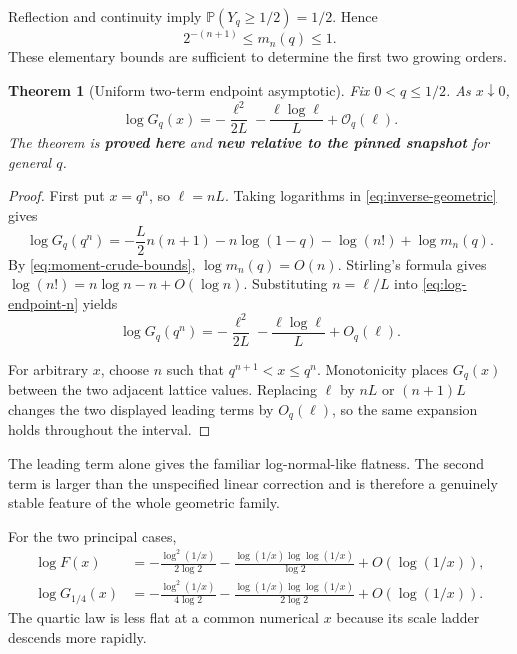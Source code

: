 \documentclass[11pt,oneside]{article}
\numberwithin{equation}{section}
\newtheorem{theorem}{Theorem}[section]
\theoremstyle{definition}
\theoremstyle{remark}
\newcommand{\Prob}{\mathbb P}
\newcommand{\bigO}{\mathcal O}
\newcommand{\proved}{\textcolor{deepgreen}{\textbf{proved here}}}
\newcommand{\auditnew}{\textcolor{deepviolet}{\textbf{new relative to the pinned snapshot}}}
\begin{document}
Reflection and continuity imply
$\Prob(Y_q\ge1/2)=1/2$.  Hence
\begin{equation}
 2^{-(n+1)}\le m_n(q)\le1.
 \label{eq:moment-crude-bounds}
\end{equation}
These elementary bounds are sufficient to determine the first two growing
orders.

\begin{theorem}[Uniform two-term endpoint asymptotic]
\label{thm:endpoint-asymptotic}
Fix $0<q\le1/2$.  As $x\downarrow0$,
\begin{equation}
 \boxed{
 \log G_q(x)=
 -\frac{\ell^2}{2L}
 -\frac{\ell\log\ell}{L}
 +\bigO_q(\ell).}
 \label{eq:endpoint-asymptotic}
\end{equation}
The theorem is \proved{} and \auditnew{} for general $q$.
\end{theorem}

\begin{proof}
First put $x=q^n$, so $\ell=nL$.  Taking logarithms in
\eqref{eq:inverse-geometric} gives
\begin{equation}
 \log G_q(q^n)
 =-\frac{L}{2}n(n+1)-n\log(1-q)-\log(n!)+\log m_n(q).
 \label{eq:log-endpoint-n}
\end{equation}
By \eqref{eq:moment-crude-bounds}, $\log m_n(q)=O(n)$.  Stirling's formula
gives
$\log(n!)=n\log n-n+O(\log n)$.  Substituting $n=\ell/L$ into
\eqref{eq:log-endpoint-n} yields
\[
 \log G_q(q^n)
 =-\frac{\ell^2}{2L}
  -\frac{\ell\log\ell}{L}+O_q(\ell).
\]

For arbitrary $x$, choose $n$ such that $q^{n+1}<x\le q^n$.  Monotonicity
places $G_q(x)$ between the two adjacent lattice values.  Replacing $\ell$ by
$nL$ or $(n+1)L$ changes the two displayed leading terms by $O_q(\ell)$, so the
same expansion holds throughout the interval.
\end{proof}

The leading term alone gives the familiar log-normal-like flatness.  The
second term is larger than the unspecified linear correction and is therefore
a genuinely stable feature of the whole geometric family.

For the two principal cases,
\begin{align}
 \log F(x)
 &=-\frac{\log^2(1/x)}{2\log2}
   -\frac{\log(1/x)\log\log(1/x)}{\log2}
   +O(\log(1/x)),
 \label{eq:dyadic-two-term}\\
 \log G_{1/4}(x)
 &=-\frac{\log^2(1/x)}{4\log2}
   -\frac{\log(1/x)\log\log(1/x)}{2\log2}
   +O(\log(1/x)).
 \label{eq:quartic-two-term}
\end{align}
The quartic law is less flat at a common numerical $x$ because its scale
ladder descends more rapidly.
\end{document}
